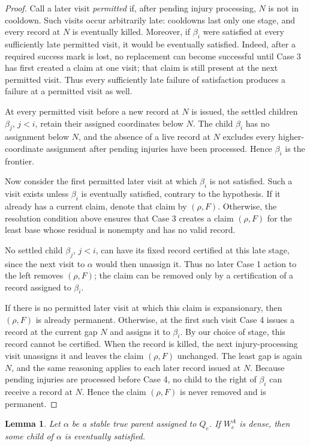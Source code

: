 \documentclass[11pt]{amsart}
\newtheorem{lemma}[theorem]{Lemma}
\begin{document}
\begin{proof}
Call a later visit \emph{permitted} if, after pending injury processing,
$N$ is not in cooldown. Such visits occur arbitrarily late: cooldowns last
only one stage, and
every record at $N$ is eventually killed. Moreover, if $\beta_i$ were
satisfied at every sufficiently late permitted visit, it would be eventually
satisfied. Indeed, after a required success mark is lost, no replacement can
become successful until Case 3 has first created a claim at one visit; that
claim is still present at the next permitted visit. Thus every sufficiently
late failure of satisfaction produces a failure at a permitted visit as well.

At every permitted visit before a new record at $N$ is issued, the settled
children $\beta_j$, $j<i$, retain their assigned coordinates below $N$. The
child $\beta_i$ has no assignment below $N$, and the absence of a live record
at $N$ excludes every higher-coordinate assignment after pending injuries
have been processed. Hence $\beta_i$ is the frontier.

Now consider the first permitted later visit at which $\beta_i$ is not
satisfied. Such a visit exists unless $\beta_i$ is eventually satisfied,
contrary to the hypothesis. If it already has a current claim, denote that
claim by $(\rho,F)$. Otherwise, the resolution condition above ensures that
Case 3 creates a claim $(\rho,F)$ for the least base whose residual is
nonempty and has no valid record.

No settled child $\beta_j$, $j<i$, can have its fixed record certified at
this late stage, since the next visit to $\alpha$ would then unassign it.
Thus no later Case 1 action to the left removes $(\rho,F)$; the claim can be
removed only by a certification of a record assigned to $\beta_i$.

If there is no permitted later visit at which this claim is expansionary,
then $(\rho,F)$ is already permanent. Otherwise, at the first such visit
Case 4 issues a record at the current gap $N$ and assigns it to $\beta_i$.
By our choice of stage, this record cannot be certified. When the record is
killed, the next injury-processing visit unassigns it and leaves the claim
$(\rho,F)$ unchanged. The least gap is again $N$, and the same reasoning
applies to each later record issued at $N$. Because pending injuries are
processed before Case 4, no child to the right of $\beta_i$ can receive a
record at $N$. Hence the claim $(\rho,F)$ is never removed and is permanent.
\end{proof}


\begin{lemma}\label{low2:density}
Let $\alpha$ be a stable true parent assigned to $Q_e$. If $W_e^A$ is dense,
then some child of $\alpha$ is eventually satisfied.
\end{lemma}
\end{document}
